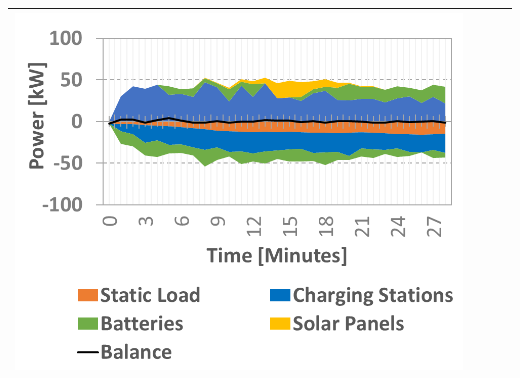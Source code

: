 \begin{table}[b]
\begin{tabularx}{\textwidth}{|Y|Y|Y|Y|}
		\includegraphics[trim=0 0 0 -3,scale=0.285]{../gfx/data/E4_001.png} \\ \hline
		

\end{tabularx}
\end{table}
